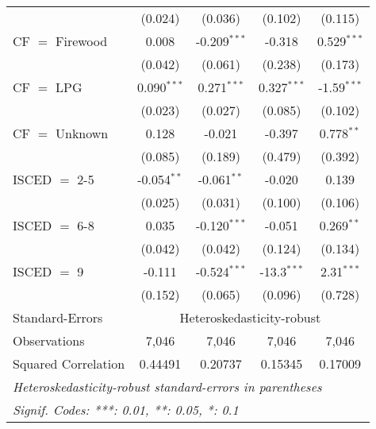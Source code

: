 \begin{table}[htbp!]
\begin{adjustbox}{width = 1\textwidth, max height = 0.95\textheight, center}
\begin{threeparttable}[b]
\begin{tabular}{lcccc}
                                 & (0.024)            & (0.036)            & (0.102)        & (0.115)\\   
            CF $=$ Firewood      & 0.008              & -0.209$^{***}$     & -0.318         & 0.529$^{***}$\\   
                                 & (0.042)            & (0.061)            & (0.238)        & (0.173)\\   
            CF $=$ LPG           & 0.090$^{***}$      & 0.271$^{***}$      & 0.327$^{***}$  & -1.59$^{***}$\\   
                                 & (0.023)            & (0.027)            & (0.085)        & (0.102)\\   
            CF $=$ Unknown       & 0.128              & -0.021             & -0.397         & 0.778$^{**}$\\   
                                 & (0.085)            & (0.189)            & (0.479)        & (0.392)\\   
            ISCED $=$ 2-5        & -0.054$^{**}$      & -0.061$^{**}$      & -0.020         & 0.139\\   
                                 & (0.025)            & (0.031)            & (0.100)        & (0.106)\\   
            ISCED $=$ 6-8        & 0.035              & -0.120$^{***}$     & -0.051         & 0.269$^{**}$\\   
                                 & (0.042)            & (0.042)            & (0.124)        & (0.134)\\   
            ISCED $=$ 9          & -0.111             & -0.524$^{***}$     & -13.3$^{***}$  & 2.31$^{***}$\\   
                                 & (0.152)            & (0.065)            & (0.096)        & (0.728)\\   
            \midrule 
            Standard-Errors & \multicolumn{4}{c}{Heteroskedasticity-robust} \\ 
            Observations         & 7,046              & 7,046              & 7,046          & 7,046\\  
            Squared Correlation  & 0.44491            & 0.20737            & 0.15345        & 0.17009\\  
            \midrule \midrule
            \multicolumn{5}{l}{\emph{Heteroskedasticity-robust standard-errors in parentheses}}\\
            \multicolumn{5}{l}{\emph{Signif. Codes: ***: 0.01, **: 0.05, *: 0.1}}\\
         \end{tabular}
         

\end{threeparttable}
\end{adjustbox}
\end{table}
